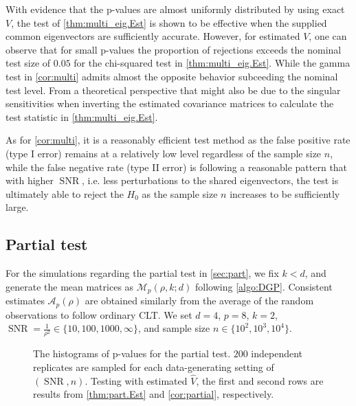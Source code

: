 \documentclass[12pt]{article}
\numberwithin{thm}{section}
\numberwithin{defn}{section}
\numberwithin{lem}{section}
\numberwithin{prop}{section}
\numberwithin{cor}{section}
\numberwithin{rem}{section}
\DeclareMathOperator{\SNR}{SNR}
\begin{document}
With evidence that the p-values are almost uniformly distributed by using exact $V$, the test of \autoref{thm:multi_eig.Est} is shown to be effective when the supplied common eigenvectors are sufficiently accurate. However, for estimated $V$, one can observe that for small p-values the proportion of rejections exceeds the nominal test size of $0.05$ for the chi-squared test in \autoref{thm:multi_eig.Est}. While the gamma test in \autoref{cor:multi} admits almost the opposite behavior subceeding the nominal test level. From a theoretical perspective that might also be due to the singular sensitivities when inverting the estimated covariance matrices to calculate the test statistic in \autoref{thm:multi_eig.Est}.

As for \autoref{cor:multi}, it is a reasonably efficient test method as the false positive rate (type I error) remains at a relatively low level regardless of the sample size $n$, while the false negative rate (type II error) is following a reasonable pattern that with higher $\SNR$, i.e. less perturbations to the shared eigenvectors, the test is ultimately able to reject the $H_0$ as the sample size $n$ increases to be sufficiently large.

\vspace{-0.5cm}
\subsection{Partial test} \label{subse:partialtest}
\vspace{-0.3cm}
For the simulations regarding the partial test in \autoref{sec:part}, we fix $k<d$, and generate the mean matrices as $\mathcal{M}_p(\rho, k; d)$ following \autoref{algo:DGP}. Consistent estimates $\mathcal{A}_p(\rho)$ are obtained similarly from the average of the random observations to follow ordinary CLT. We set $d = 4$, $p = 8$, $k = 2$, $\SNR = \frac{1}{\rho^2} \in \{10, 100, 1000, \infty\}$, and sample size $n \in \{10^2, 10^3, 10^4\}$.

\begin{figure}[htb] %
    \centering
    \centerline{}
    \caption{The histograms of p-values for the partial test. $200$ independent replicates are sampled for each data-generating setting of $(\SNR, n)$. Testing with estimated $\widehat{V}$, the first and second rows are results from \autoref{thm:part.Est} and \autoref{cor:partial}, respectively.}
   \label{fig:partial}
\end{figure}
\end{document}
